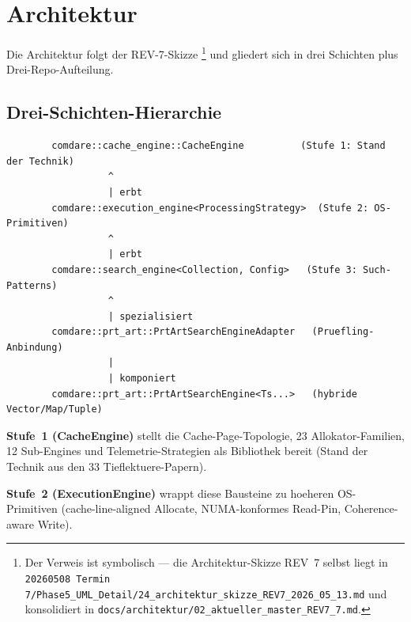 \chapter{Architektur}\label{ch:architektur}


Die Architektur folgt der REV-7-Skizze \cite{leis2013art}\footnote{
Der Verweis ist symbolisch --- die Architektur-Skizze REV~7 selbst liegt in
\texttt{20260508 Termin 7/Phase5\_UML\_Detail/24\_architektur\_skizze\_REV7\_2026\_05\_13.md}
und konsolidiert in \texttt{docs/architektur/02\_aktueller\_master\_REV7\_7.md}.}
und gliedert sich in drei Schichten plus Drei-Repo-Aufteilung.

\section{Drei-Schichten-Hierarchie}

\begin{verbatim}
        comdare::cache_engine::CacheEngine          (Stufe 1: Stand der Technik)
                  ^
                  | erbt
        comdare::execution_engine<ProcessingStrategy>  (Stufe 2: OS-Primitiven)
                  ^
                  | erbt
        comdare::search_engine<Collection, Config>   (Stufe 3: Such-Patterns)
                  ^
                  | spezialisiert
        comdare::prt_art::PrtArtSearchEngineAdapter   (Pruefling-Anbindung)
                  |
                  | komponiert
        comdare::prt_art::PrtArtSearchEngine<Ts...>   (hybride Vector/Map/Tuple)
\end{verbatim}

\textbf{Stufe~1 (CacheEngine)} stellt die Cache-Page-Topologie, 23
Allokator-Familien, 12 Sub-Engines und Telemetrie-Strategien als
Bibliothek bereit (Stand der Technik aus den 33 Tieflektuere-Papern).

\textbf{Stufe~2 (ExecutionEngine)} wrappt diese Bausteine zu hoeheren
OS-Primitiven (cache-line-aligned Allocate, NUMA-konformes Read-Pin,
Coherence-aware Write).

